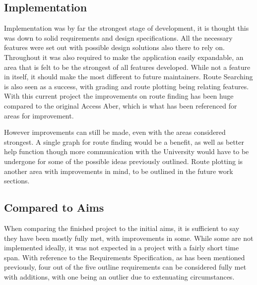 \subsection{Implementation}
Implementation was by far the strongest stage of development, it is thought this was down to solid requirements and design specifications. All the necessary features were set out with possible design solutions also there to rely on. Throughout it was also required to make the application easily expandable, an area that is felt to be the strongest of all features developed. While not a feature in itself, it should make the most different to future maintainers. Route Searching is also seen as a success, with grading and route plotting being relating features. With this current project the improvements on route finding has been huge compared to the original Access Aber\cite{aa}, which is what has been referenced for areas for improvement. 

However improvements can still be made, even with the areas considered strongest. A single graph for route finding would be a benefit, as well as better help function though more communication with the University would have to be undergone for some of the possible ideas previously outlined. Route plotting is another area with improvements in mind, to be outlined in the future work sections. 
\subsection{Compared to Aims}
When comparing the finished project to the initial aims, it is sufficient to say they have been mostly fully met, with improvements in some. While some are not implemented ideally, it was not expected in a project with a fairly short time span. With reference to the Requirements Specification, as has been mentioned previously, four out of the five outline requirements can be considered fully met with additions, with one being an outlier due to extenuating circumstances. 

